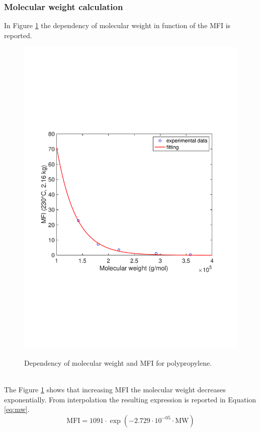 \documentclass[a4paper, 11pt]{article}
\begin{document}
\newpage

\subsubsection{Molecular weight calculation}

In Figure \ref{fig:mw} the dependency of molecular weight in function of the MFI is reported.
\begin{figure}[h!]
	\centering
	{\includegraphics[scale=0.4]{mw}}
	\captionsetup{justification=centering}
	\caption{Dependency of molecular weight and MFI for polypropylene.}
	\label{fig:mw}
\end{figure}\\
The Figure \ref{fig:mw} shows that increasing MFI the molecular weight decreases exponentially. From interpolation the resulting expression is reported in Equation \ref{eq:mw}. 
\begin{equation}
\text{MFI} = 1091\cdot \exp({-2.729\cdot 10^{-05}\cdot\text{MW}})
\label{eq:mw}
\end{equation}
\end{document}
